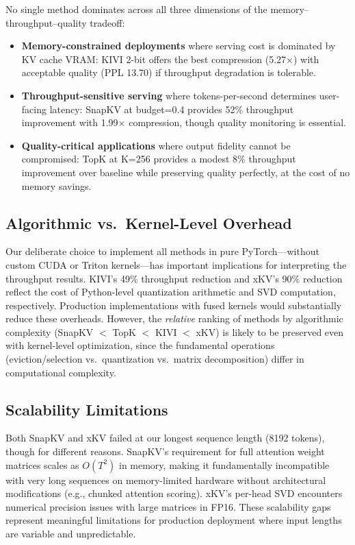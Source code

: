 \documentclass[conference]{IEEEtran}
\begin{document}
No single method dominates across all three dimensions of the memory--throughput--quality tradeoff:

\begin{itemize}
    \item \textbf{Memory-constrained deployments} where serving cost is dominated by KV cache VRAM: KIVI 2-bit offers the best compression (5.27$\times$) with acceptable quality (PPL 13.70) if throughput degradation is tolerable.
    \item \textbf{Throughput-sensitive serving} where tokens-per-second determines user-facing latency: SnapKV at budget=0.4 provides 52\% throughput improvement with 1.99$\times$ compression, though quality monitoring is essential.
    \item \textbf{Quality-critical applications} where output fidelity cannot be compromised: TopK at K=256 provides a modest 8\% throughput improvement over baseline while preserving quality perfectly, at the cost of no memory savings.
\end{itemize}

\subsection{Algorithmic vs.\ Kernel-Level Overhead}

Our deliberate choice to implement all methods in pure PyTorch---without custom CUDA or Triton kernels---has important implications for interpreting the throughput results. KIVI's 49\% throughput reduction and xKV's 90\% reduction reflect the cost of Python-level quantization arithmetic and SVD computation, respectively. Production implementations with fused kernels would substantially reduce these overheads. However, the \textit{relative} ranking of methods by algorithmic complexity (SnapKV $<$ TopK $<$ KIVI $<$ xKV) is likely to be preserved even with kernel-level optimization, since the fundamental operations (eviction/selection vs.\ quantization vs.\ matrix decomposition) differ in computational complexity.

\subsection{Scalability Limitations}

Both SnapKV and xKV failed at our longest sequence length (8192 tokens), though for different reasons. SnapKV's requirement for full attention weight matrices scales as $O(T^2)$ in memory, making it fundamentally incompatible with very long sequences on memory-limited hardware without architectural modifications (e.g., chunked attention scoring). xKV's per-head SVD encounters numerical precision issues with large matrices in FP16. These scalability gaps represent meaningful limitations for production deployment where input lengths are variable and unpredictable.
\end{document}

